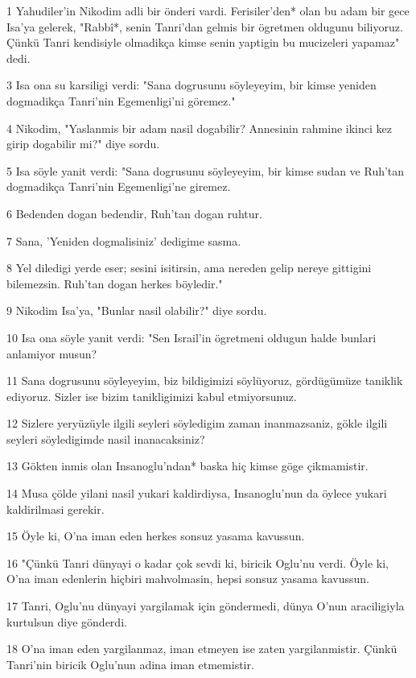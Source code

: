 \par 1 Yahudiler'in Nikodim adli bir önderi vardi. Ferisiler'den* olan bu adam bir gece Isa'ya gelerek, "Rabbî*, senin Tanri'dan gelmis bir ögretmen oldugunu biliyoruz. Çünkü Tanri kendisiyle olmadikça kimse senin yaptigin bu mucizeleri yapamaz" dedi.
\par 3 Isa ona su karsiligi verdi: "Sana dogrusunu söyleyeyim, bir kimse yeniden dogmadikça Tanri'nin Egemenligi'ni göremez."
\par 4 Nikodim, "Yaslanmis bir adam nasil dogabilir? Annesinin rahmine ikinci kez girip dogabilir mi?" diye sordu.
\par 5 Isa söyle yanit verdi: "Sana dogrusunu söyleyeyim, bir kimse sudan ve Ruh'tan dogmadikça Tanri'nin Egemenligi'ne giremez.
\par 6 Bedenden dogan bedendir, Ruh'tan dogan ruhtur.
\par 7 Sana, 'Yeniden dogmalisiniz' dedigime sasma.
\par 8 Yel diledigi yerde eser; sesini isitirsin, ama nereden gelip nereye gittigini bilemezsin. Ruh'tan dogan herkes böyledir."
\par 9 Nikodim Isa'ya, "Bunlar nasil olabilir?" diye sordu.
\par 10 Isa ona söyle yanit verdi: "Sen Israil'in ögretmeni oldugun halde bunlari anlamiyor musun?
\par 11 Sana dogrusunu söyleyeyim, biz bildigimizi söylüyoruz, gördügümüze taniklik ediyoruz. Sizler ise bizim tanikligimizi kabul etmiyorsunuz.
\par 12 Sizlere yeryüzüyle ilgili seyleri söyledigim zaman inanmazsaniz, gökle ilgili seyleri söyledigimde nasil inanacaksiniz?
\par 13 Gökten inmis olan Insanoglu'ndan* baska hiç kimse göge çikmamistir.
\par 14 Musa çölde yilani nasil yukari kaldirdiysa, Insanoglu'nun da öylece yukari kaldirilmasi gerekir.
\par 15 Öyle ki, O'na iman eden herkes sonsuz yasama kavussun.
\par 16 "Çünkü Tanri dünyayi o kadar çok sevdi ki, biricik Oglu'nu verdi. Öyle ki, O'na iman edenlerin hiçbiri mahvolmasin, hepsi sonsuz yasama kavussun.
\par 17 Tanri, Oglu'nu dünyayi yargilamak için göndermedi, dünya O'nun araciligiyla kurtulsun diye gönderdi.
\par 18 O'na iman eden yargilanmaz, iman etmeyen ise zaten yargilanmistir. Çünkü Tanri'nin biricik Oglu'nun adina iman etmemistir.
